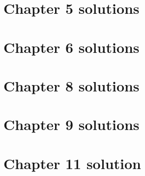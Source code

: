 \documentclass{article}
\begin{document}
\newpage
\section{Chapter 5 solutions}


\newpage
\section{Chapter 6 solutions}


\newpage
\section{Chapter 8 solutions}

\newpage


\section{Chapter 9 solutions}

\newpage


\section{Chapter 11 solution}

\end{document}
